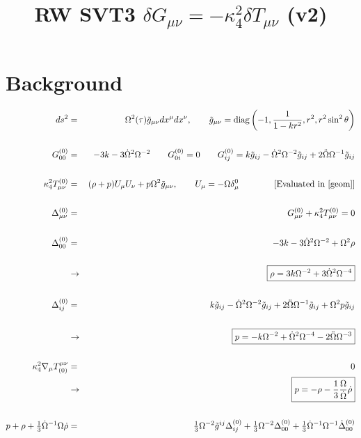 \documentclass[10pt,letterpaper]{article}
\title{RW SVT3 $\delta G_{\mu\nu}=-\kappa^2_4\delta T_{\mu\nu}$ \quad (v2)}
\date{}
\numberwithin{equation}{section}
\begin{document}
 
\maketitle
\noindent 
\section{Background}
\begin{eqnarray}
ds^2 &=& \Omega^2(\tau)\tilde g_{\mu\nu} dx^\mu dx^\nu,\qquad 
\tilde g_{\mu\nu} = \text{diag}\left(-1,\frac{1}{1-kr^2},r^2,r^2\sin^2\theta\right)
\label{geom}
\\ \nonumber\\
G^{(0)}_{00}&=& -3k - 3 \dot\Omega^2\Omega^{-2}
\qquad
G^{(0)}_{0i} =0
\qquad
G^{(0)}_{ij} = k\tilde g_{ij} - \dot\Omega^2\Omega^{-2}\tilde g_{ij} + 2\ddot\Omega \Omega^{-1} \tilde g_{ij}
\\ \nonumber\\
\kappa^2_4 T_{\mu\nu}^{(0)} &=& (\rho+p)U_\mu U_\nu + p \Omega^2 \tilde g_{\mu\nu},\qquad U_\mu = - \Omega \delta^0_\mu  \qquad\qquad  \text{[Evaluated in \eqref{geom}]}
\\ \nonumber\\
\Delta^{(0)}_{\mu\nu} &=& G_{\mu\nu}^{(0)}+\kappa^2_4 T_{\mu\nu}^{(0)} =0
\\ \nonumber\\
\Delta^{(0)}_{00} &=& -3k - 3 \dot\Omega^2\Omega^{-2} + \Omega^2 \rho
\\ \nonumber\\
&\to&\boxed{\rho = 3k\Omega^{-2}+3\dot\Omega^2 \Omega^{-4}}
\label{rho}
\\ \nonumber\\
\Delta^{(0)}_{ij} &=& k\tilde g_{ij} - \dot\Omega^2\Omega^{-2}\tilde g_{ij} + 2\ddot\Omega \Omega^{-1} \tilde g_{ij} + \Omega^2 p
\tilde g_{ij}
\\ \nonumber\\
&\to& \boxed{p = -k\Omega^{-2} + \dot\Omega^2\Omega^{-4} -2\ddot\Omega \Omega^{-3}}
\label{p}
\\ \nonumber\\
\kappa^2_4\nabla_\mu T^{\mu\nu}_{(0)} &=& 0
\nonumber\\
&\to& \boxed{p = -\rho -\frac13 \frac{\Omega}{\dot\Omega}\dot\rho}
\\ \nonumber\\
 p+\rho+\tfrac13 \dot\Omega^{-1}\Omega\dot\rho &=&\tfrac13 \Omega^{-2}\tilde g^{ij} \Delta^{(0)}_{ij} + \tfrac13 \Omega^{-2}\Delta^{(0)}_{00} + \tfrac13 \dot\Omega^{-1}\Omega^{-1} \dot \Delta^{(0)}_{00}
\end{eqnarray}
%
%
%
\end{document}
